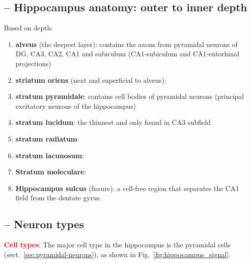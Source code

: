 \subsection{-- Hippocampus anatomy: outer to inner depth}

Based on depth:  
  \begin{enumerate}
    \item {\bf alveus} (the deepest layer): contains the axons from pyramidal
    neurons of DG, CA3, CA2, CA1 and subiculum (CA1-subiculum and CA1-entorhinal projections)
    
    \item {\bf striatum oriens} (next and superficial to alveus): 
    
    \item {\bf stratum pyramidale}: contains cell bodies of pyramidal neurons
    (principal excitatory neurons of the hippocampus)
    
    \item {\bf stratum lucidum}: the thinnest and only found in CA3 subfield
    
    \item {\bf stratum radiatum}: 
    
    \item {\bf stratum lacunosum}:
    
    \item {\bf Stratum moleculare}: 
    
    \item {\bf Hippocampus sulcus} (fissure): a cell-free region that separates
    the CA1 field from the dentate gyrus.
  \end{enumerate}




\subsection{-- Neuron types}
\label{sec:signal_hippocampus_cell}

\textcolor{red}{\bf Cell types}:
The major cell type in the hippocampus is the pyramidal cells
(sect.~\ref{sec:pyramidal-neurons}), as shown in
Fig.~\ref{fig:hippocampus_signal}. 

